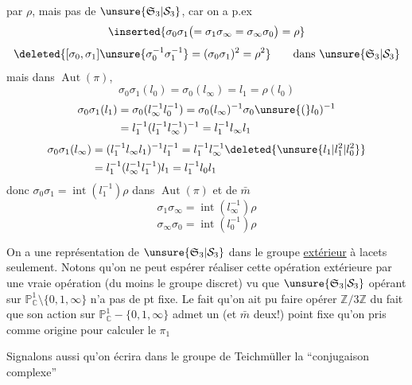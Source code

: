 par $\rho$, mais pas de $\unsure{\mathfrak S_3|\mathcal S_3}$, car on a p.ex
\[
\inserted{\sigma_0\sigma_1\bigl(=\sigma_1\sigma_\infty=\sigma_\infty\sigma_0\bigr)=\rho}
\]
\[
\deleted{[\sigma_0,\sigma_1]\unsure{\sigma_0^{-1}\sigma_1^{-1}}=(\sigma_0\sigma_1)^2=\rho^2}\qquad\text{dans }\unsure{\mathfrak S_3|\mathcal S_3}
\]
mais dans $\operatorname{Aut}(\pi)$, 
\[
\sigma_0\sigma_1(l_0)=\sigma_0(l_\infty)=l_1=\rho(l_0)
\]
\[
\begin{aligned}
\sigma_0\sigma_1(l_1)&=\sigma_0(l_\infty^{-1}l_0^{-1})=\sigma_0(l_\infty)^{-1}\sigma_0\unsure{(}l_0)^{-1}\\
&=l_1^{-1}(l_1^{-1}l_\infty^{-1})^{-1}=l_1^{-1}l_\infty l_1
\end{aligned}
\]
\[
\begin{aligned}
\sigma_0\sigma_1(l_\infty)&=(l_1^{-1}l_\infty l_1)^{-1}l_1^{-1}=l_1^{-1}l_\infty^{-1}\deleted{\unsure{l_1|l_1^2|l_0^2}}\\
&=l_1^{-1}(l_\infty^{-1}l_1^{-1})l_1=l_1^{-1}l_0l_1
\end{aligned}
\]
donc $\sigma_0\sigma_1=\operatorname{int}(l_1^{-1})\rho$ dans $\operatorname{Aut}(\pi)$
et de $\bar m$
\[
\sigma_1\sigma_\infty=\operatorname{int}(l_\infty^{-1})\rho
\]
\[
\sigma_\infty\sigma_0=\operatorname{int}(l_0^{-1})\rho
\]

On a une représentation de $\unsure{\mathfrak S_3|\mathcal S_3}$ dans le groupe \uline{extérieur} à lacets seulement. Notons qu'on ne peut espérer réaliser cette opération extérieure par une vraie opération (du moins  le groupe discret) vu que $\unsure{\mathfrak S_3|\mathcal S_3}$ opérant sur $\mathbb P^1_{\mathbb C}\setminus\{0,1,\infty\}$ n'a pas de pt fixe. Le fait qu'on ait pu faire opérer $\mathbb Z/3\mathbb Z$   du fait que son action sur $\mathbb P^1_{\mathbb C}-\{0,1,\infty\}$ admet un (et $\bar m$ deux!) point fixe qu'on   pris comme origine pour calculer le $\pi_1$

Signalons aussi qu'on écrira dans le groupe de Teichmüller  la ``conjugaison complexe''
